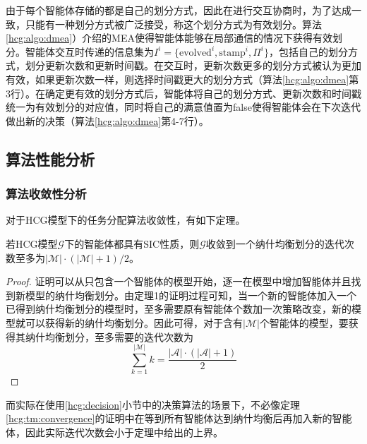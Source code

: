由于每个智能体存储的都是自己的划分方式，因此在进行交互协商时，为了达成一致，只能有一种划分方式被广泛接受，称这个划分方式为有效划分。算法\ref{hcg:algo:dmea}）介绍的MEA使得智能体能够在局部通信的情况下获得有效划分。智能体交互时传递的信息集为$I^i=\{\text{evolved}^i,\text{stamp}^i,\Pi^i\}$，包括自己的划分方式，划分更新次数和更新时间戳。在交互时，更新次数更多的划分方式被认为更加有效，如果更新次数一样，则选择时间戳更大的划分方式（算法\ref{hcg:algo:dmea}第3行）。在确定更有效的划分方式后，智能体将自己的划分方式、更新次数和时间戳统一为有效划分的对应值，同时将自己的满意值置为false使得智能体会在下次迭代做出新的决策（算法\ref{hcg:algo:dmea}第4-7行）。


\subsection{算法性能分析}
\label{hcg:performance}

\subsubsection{算法收敛性分析}
\label{perform:convergence}

对于HCG模型下的任务分配算法收敛性，有如下定理。

\begin{theorem}[收敛性]
\label{hcg:tm:convergence}
	若HCG模型$\mathcal{G}$下的智能体都具有SIC性质，则$\mathcal{G}$收敛到一个纳什均衡划分的迭代次数至多为$|\mathcal{M}|\cdot(|\mathcal{M}|+1)/2$。
	\begin{proof}
		证明可以从只包含一个智能体的模型开始，逐一在模型中增加智能体并且找到新模型的纳什均衡划分。由定理1的证明过程可知，当一个新的智能体加入一个已得到纳什均衡划分的模型时，至多需要原有智能体个数加一次策略改变，新的模型就可以获得新的纳什均衡划分。因此可得，对于含有$|\mathcal{M}|$个智能体的模型，要获得其纳什均衡划分，至多需要的迭代次数为
		\begin{equation}
		\label{hcg:eq:maxiter}
			\sum_{k=1}^{|\mathcal{M}|} k = \frac{|\mathcal{A}|\cdot(|\mathcal{A}|+1)}{2}
		\end{equation}
		
	\end{proof}
\end{theorem}

而实际在使用\ref{hcg:decision}小节中的决策算法的场景下，不必像定理\ref{hcg:tm:convergence}的证明中在等到所有智能体达到纳什均衡后再加入新的智能体，因此实际迭代次数会小于定理中给出的上界。
